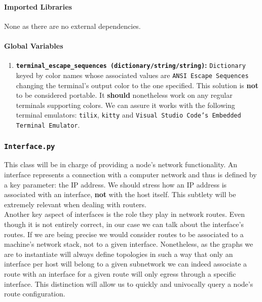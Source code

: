                \paragraph{Imported Libraries}
                    None as there are no external dependencies.

                \paragraph{Global Variables}
                    \begin{enumerate}
                        \item \textbf{\texttt{terminal\_escape\_sequences (dictionary/string/string)}:} \texttt{Dictionary} keyed by color names whose associated values are \texttt{ANSI Escape Sequences} changing the terminal's output color to the one specified. This solution is \textbf{not} to be considered portable. It \textbf{should} nonetheless work on any regular terminals supporting colors. We can assure it works with the following terminal emulators: \texttt{tilix}, \texttt{kitty} and \texttt{Visual Studio Code's Embedded Terminal Emulator}.
                    \end{enumerate}

            \subsubsection{\texttt{Interface.py}}
                This class will be in charge of providing a node's network functionality. An interface represents a connection with a computer network and thus is defined by a key parameter: the IP address. We should stress how an IP address is associated with an interface, \textbf{not} with the host itself. This subtlety will be extremely relevant when dealing with routers.\\

                Another key aspect of interfaces is the role they play in network routes. Even though it is not entirely correct, in our case we can talk about the interface's routes. If we are being precise we would consider routes to be associated to a machine's network stack, not to a given interface. Nonetheless, as the graphs we are to instantiate will always define topologies in such a way that only an interface per host will belong to a given subnetwork we can indeed associate a route with an interface for a given route will only egress through a specific interface. This distinction will allow us to quickly and univocally query a node's route configuration.\\

